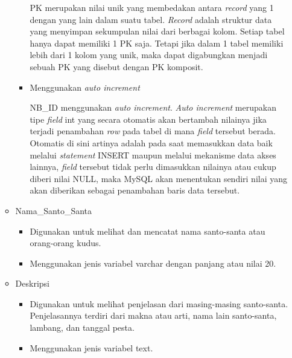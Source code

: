 \documentclass[a4paper,twoside]{article}
\begin{document}
\begin{enumerate}
\begin{itemize}
\begin{itemize}
			PK merupakan nilai unik yang membedakan antara \textit{record} yang 1 dengan yang lain dalam suatu tabel. \textit{Record} adalah struktur data yang menyimpan sekumpulan nilai dari berbagai kolom. Setiap tabel hanya dapat memiliki 1 PK saja. Tetapi jika dalam 1 tabel memiliki lebih dari 1 kolom yang unik, maka dapat digabungkan menjadi sebuah PK yang disebut dengan PK komposit. %
			\item Menggunakan \textit{auto increment}
			
			NB\_ID menggunakan \textit{auto increment}. \textit{Auto increment} merupakan tipe \textit{field} int yang secara otomatis akan bertambah nilainya jika terjadi penambahan \textit{row} pada tabel di mana \textit{field} tersebut berada. Otomatis di sini artinya adalah pada saat memasukkan data baik melalui \textit{statement} INSERT maupun melalui mekanisme data akses lainnya, \textit{field} tersebut tidak perlu dimasukkan nilainya atau cukup diberi nilai NULL, maka MySQL akan menentukan sendiri nilai yang akan diberikan sebagai penambahan baris data tersebut. 
		\end{itemize}
		
		\item Nama\_Santo\_Santa 
				
		\begin{itemize}
			\item Digunakan untuk melihat dan mencatat nama santo-santa atau orang-orang kudus.
			\item Menggunakan jenis variabel varchar dengan panjang atau nilai 20.
		\end{itemize}
		
		\item Deskripsi 
			
		\begin{itemize}
			\item Digunakan untuk melihat penjelasan dari masing-masing santo-santa. Penjelasannya terdiri dari makna atau arti, nama lain santo-santa, lambang, dan tanggal pesta. 
			\item Menggunakan jenis variabel text.
		\end{itemize}
	\end{itemize}



\end{enumerate}
\end{document}
